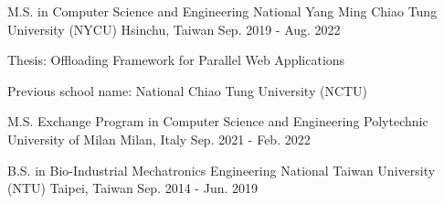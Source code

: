 

\begin{cventries}

  
\cventry
  {M.S. in Computer Science and Engineering} %
  {National Yang Ming Chiao Tung University (NYCU)} %
  {Hsinchu, Taiwan} %
  {Sep. 2019 - Aug. 2022} %
  {
    \begin{cvitems} %
      \item {Thesis: Offloading Framework for Parallel Web Applications}
      \item {Previous school name: National Chiao Tung University (NCTU)}
    \end{cvitems}
  }

\cventry
    {M.S. Exchange Program in Computer Science and Engineering} %
    {Polytechnic University of Milan} %
    {Milan, Italy} %
    {Sep. 2021 - Feb. 2022} %
    {
      \begin{cvitems} %
      \end{cvitems}
    }

  \cventry
    {B.S. in Bio-Industrial Mechatronics Engineering} %
    {National Taiwan University (NTU)} %
    {Taipei, Taiwan} %
    {Sep. 2014 - Jun. 2019} %
    {
      \begin{cvitems} %
      \end{cvitems}
    }

\end{cventries}
